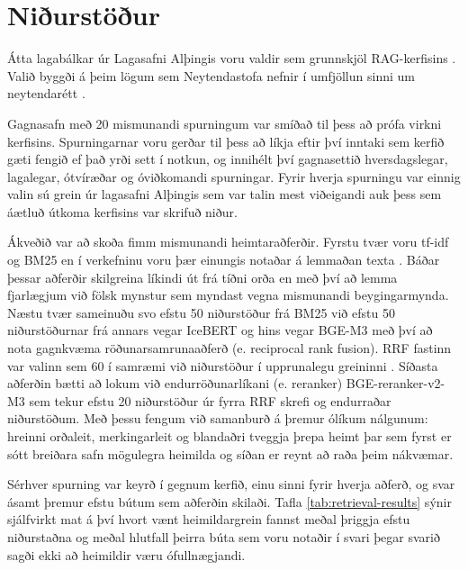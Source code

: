 \documentclass[fleqn]{report}
\begin{document}
\section{Niðurstöður}
Átta lagabálkar úr Lagasafni Alþingis voru valdir sem grunnskjöl RAG-kerfisins \cite{2003,2002,2011,2013a,2013b,2016a,2016b,2018}. Valið byggði á þeim lögum sem Neytendastofa nefnir í umfjöllun sinni um neytendarétt \cite{neytendastofa}.


Gagnasafn með 20 mismunandi spurningum var smíðað til þess að prófa virkni kerfisins. Spurningarnar voru gerðar til þess að líkja eftir því inntaki sem kerfið gæti fengið ef það yrði sett í notkun, og innihélt því gagnasettið hversdagslegar, lagalegar, ótvíræðar og óviðkomandi spurningar. Fyrir hverja spurningu var einnig valin sú grein úr lagasafni Alþingis sem var talin mest viðeigandi auk þess sem áætluð útkoma kerfisins var skrifuð niður. 

Ákveðið var að skoða fimm mismunandi heimtaraðferðir. Fyrstu tvær voru tf-idf \cite{scikit-learn} og BM25 \cite{bm25,rank-bm25} en í verkefninu voru þær einungis notaðar á lemmaðan texta \cite{greynir}. Báðar þessar aðferðir skilgreina líkindi út frá tíðni orða en með því að lemma fjarlægjum við fölsk mynstur sem myndast vegna mismunandi beygingarmynda. Næstu tvær sameinuðu svo efstu 50 niðurstöður frá BM25 við efstu 50 niðurstöðurnar frá annars vegar IceBERT \cite{icebert} og hins vegar BGE-M3 \cite{bge-m3} með því að nota gagnkvæma röðunarsamrunaaðferð (e. reciprocal rank fusion). RRF fastinn var valinn sem 60 í samræmi við niðurstöður í upprunalegu greininni \cite{rrf}. Síðasta aðferðin bætti að lokum við endurröðunarlíkani (e. reranker) \cite{pinecone-rerankers} BGE-reranker-v2-M3 \cite{reranker} sem tekur efstu 20 niðurstöður úr fyrra RRF skrefi og endurraðar niðurstöðum. Með þessu fengum við samanburð á þremur ólíkum nálgunum: hreinni orðaleit, merkingarleit og blandaðri tveggja þrepa heimt þar sem fyrst er sótt breiðara safn mögulegra heimilda og síðan er reynt að raða þeim nákvæmar.

Sérhver spurning var keyrð í gegnum kerfið, einu sinni fyrir hverja aðferð, og svar ásamt þremur efstu bútum sem aðferðin skilaði. Tafla \ref{tab:retrieval-results} sýnir sjálfvirkt mat á því hvort vænt heimildargrein fannst meðal þriggja efstu niðurstaðna og meðal hlutfall þeirra búta sem voru notaðir í svari þegar svarið sagði ekki að heimildir væru ófullnægjandi.
\end{document}

